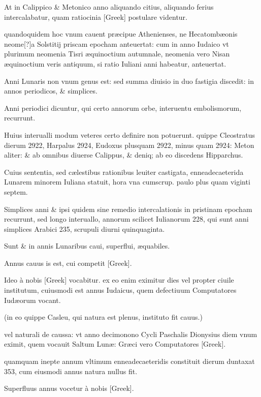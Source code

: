 \begin{parnumbers}

At in Calippico \& Metonico anno aliquando citius, aliquando ferius
intercalabatur, quam ratiocinia \textgreek{[Greek]} postulare videntur.

quandoquidem hoc vnum cauent præcipue Athenienses, ne Hecatombæonis
neome[?]a Solstitij priscam epocham anteuertat: cum in
anno Iudaico vt plurimum neomenia Tisri æquinoctium autumnale,
neomenia vero Nisan æquinoctium veris antiquum, si ratio Iuliani
anni habeatur, anteuertat.

Anni Lunaris non vnum genus est: sed
summa diuisio in duo fastigia discedit: in annos periodicos, \& simplices.

Anni periodici dicuntur, qui certo annorum orbe, interuentu
embolismorum, recurrunt.

Huius interualli modum veteres certo
definire non potuerunt. quippe Cleostratus dierum 2922, Harpalus
2924, Eudoxus plusquam 2922, minus quam 2924: Meton aliter:
\& ab omnibus diuerse Calippus, \& deniq; ab eo discedens Hipparchus.

Cuius sententia, sed cælestibus rationibus leuiter castigata, enneadecaeterida
Lunarem minorem Iuliana statuit, hora vna cumscrup. paulo
plus quam viginti septem.

Simplices anni \& ipsi quidem sine remedio
intercalationis in pristinam epocham recurrunt, sed longo interuallo,
annorum scilicet Iulianorum 228, qui sunt anni simplices Arabici 235,
scrupuli diurni quinquaginta.

Sunt \& in annis Lunaribus caui, superflui,
æquabiles.

Annus cauus is est, cui competit \textgreek{[Greek]}.

Ideo à nobis \textgreek{[Greek]} vocabitur. ex eo enim eximitur dies
vel propter ciuile institutum, cuiusmodi est annus Iudaicus,
quem defectiuum
Computatores Iudæorum vocant.

(in eo quippe Casleu, qui natura est plenus, instituto fit cauus.)

vel naturali de caussa: vt anno
decimonono Cycli Paschalis Dionysius diem vnum eximit, quem
vocauit Saltum Lunæ: Græci vero Computatores \textgreek{[Greek]}.

quamquam inepte annum vltimum enneadecaeteridis constituit dierum
duntaxat 353, cum eiusmodi annus natura nullus fit.

Superfluus
annus vocetur à nobis \textgreek{[Greek]}.


\end{parnumbers}
